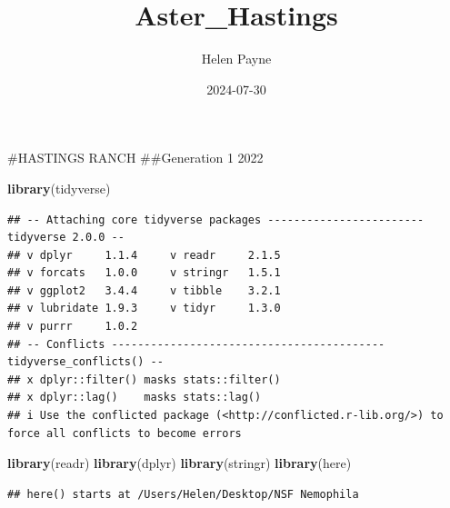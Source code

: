 \documentclass[
]{article}
\title{Aster\_Hastings}
\author{Helen Payne}
\date{2024-07-30}
\newenvironment{Shaded}{\begin{snugshade}}{\end{snugshade}}
\newcommand{\FunctionTok}[1]{\textcolor[rgb]{0.13,0.29,0.53}{\textbf{#1}}}
\newcommand{\NormalTok}[1]{#1}
\begin{document}
\maketitle

\#HASTINGS RANCH \#\#Generation 1 2022

\begin{Shaded}
\begin{Highlighting}[]
\FunctionTok{library}\NormalTok{(tidyverse)}
\end{Highlighting}
\end{Shaded}

\begin{verbatim}
## -- Attaching core tidyverse packages ------------------------ tidyverse 2.0.0 --
## v dplyr     1.1.4     v readr     2.1.5
## v forcats   1.0.0     v stringr   1.5.1
## v ggplot2   3.4.4     v tibble    3.2.1
## v lubridate 1.9.3     v tidyr     1.3.0
## v purrr     1.0.2     
## -- Conflicts ------------------------------------------ tidyverse_conflicts() --
## x dplyr::filter() masks stats::filter()
## x dplyr::lag()    masks stats::lag()
## i Use the conflicted package (<http://conflicted.r-lib.org/>) to force all conflicts to become errors
\end{verbatim}

\begin{Shaded}
\begin{Highlighting}[]
\FunctionTok{library}\NormalTok{(readr)}
\FunctionTok{library}\NormalTok{(dplyr)}
\FunctionTok{library}\NormalTok{(stringr)}
\FunctionTok{library}\NormalTok{(here)}
\end{Highlighting}
\end{Shaded}

\begin{verbatim}
## here() starts at /Users/Helen/Desktop/NSF Nemophila
\end{verbatim}
\end{document}
